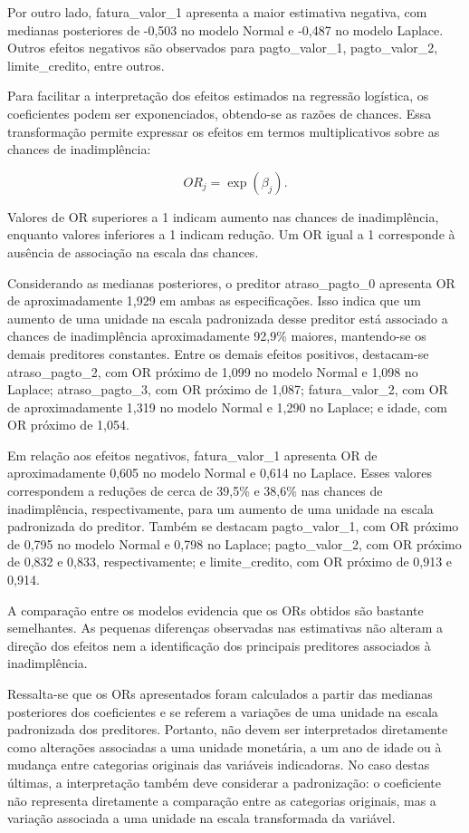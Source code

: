\documentclass[
  brazilian,
  12pt,
  letterpaper,
  DIV=11,
  numbers=noendperiod]{scrartcl}
\begin{document}
Por outro lado, fatura\_valor\_1 apresenta a maior estimativa negativa,
com medianas posteriores de -0,503 no modelo Normal e -0,487 no modelo
Laplace. Outros efeitos negativos são observados para pagto\_valor\_1,
pagto\_valor\_2, limite\_credito, entre outros.

Para facilitar a interpretação dos efeitos estimados na regressão
logística, os coeficientes podem ser exponenciados, obtendo-se as razões
de chances. Essa transformação permite expressar os efeitos em termos
multiplicativos sobre as chances de inadimplência:

\[
OR_j = \exp(\beta_j).
\]

Valores de OR superiores a 1 indicam aumento nas chances de
inadimplência, enquanto valores inferiores a 1 indicam redução. Um OR
igual a 1 corresponde à ausência de associação na escala das chances.

Considerando as medianas posteriores, o preditor atraso\_pagto\_0
apresenta OR de aproximadamente 1,929 em ambas as especificações. Isso
indica que um aumento de uma unidade na escala padronizada desse
preditor está associado a chances de inadimplência aproximadamente
92,9\% maiores, mantendo-se os demais preditores constantes. Entre os
demais efeitos positivos, destacam-se atraso\_pagto\_2, com OR próximo
de 1,099 no modelo Normal e 1,098 no Laplace; atraso\_pagto\_3, com OR
próximo de 1,087; fatura\_valor\_2, com OR de aproximadamente 1,319 no
modelo Normal e 1,290 no Laplace; e idade, com OR próximo de 1,054.

Em relação aos efeitos negativos, fatura\_valor\_1 apresenta OR de
aproximadamente 0,605 no modelo Normal e 0,614 no Laplace. Esses valores
correspondem a reduções de cerca de 39,5\% e 38,6\% nas chances de
inadimplência, respectivamente, para um aumento de uma unidade na escala
padronizada do preditor. Também se destacam pagto\_valor\_1, com OR
próximo de 0,795 no modelo Normal e 0,798 no Laplace; pagto\_valor\_2,
com OR próximo de 0,832 e 0,833, respectivamente; e limite\_credito, com
OR próximo de 0,913 e 0,914.

A comparação entre os modelos evidencia que os ORs obtidos são bastante
semelhantes. As pequenas diferenças observadas nas estimativas não
alteram a direção dos efeitos nem a identificação dos principais
preditores associados à inadimplência.

Ressalta-se que os ORs apresentados foram calculados a partir das
medianas posteriores dos coeficientes e se referem a variações de uma
unidade na escala padronizada dos preditores. Portanto, não devem ser
interpretados diretamente como alterações associadas a uma unidade
monetária, a um ano de idade ou à mudança entre categorias originais das
variáveis indicadoras. No caso destas últimas, a interpretação também
deve considerar a padronização: o coeficiente não representa diretamente
a comparação entre as categorias originais, mas a variação associada a
uma unidade na escala transformada da variável.
\end{document}

